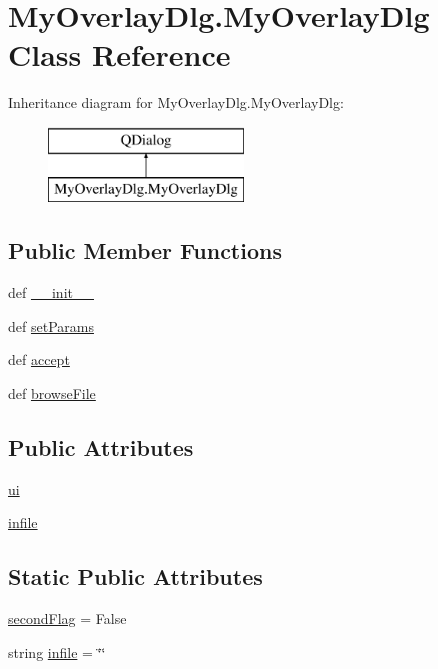 \hypertarget{class_my_overlay_dlg_1_1_my_overlay_dlg}{\section{My\-Overlay\-Dlg.\-My\-Overlay\-Dlg Class Reference}
\label{class_my_overlay_dlg_1_1_my_overlay_dlg}
}
Inheritance diagram for My\-Overlay\-Dlg.\-My\-Overlay\-Dlg\-:\begin{figure}[H]
\begin{center}
\leavevmode
\includegraphics[height=2.000000cm]{class_my_overlay_dlg_1_1_my_overlay_dlg}
\end{center}
\end{figure}
\subsection*{Public Member Functions}
\begin{DoxyCompactItemize}
\item 
def \hyperlink{class_my_overlay_dlg_1_1_my_overlay_dlg_a836f26cd68556b2b577ba8ebbc36892a}{\-\_\-\-\_\-init\-\_\-\-\_\-}
\item 
def \hyperlink{class_my_overlay_dlg_1_1_my_overlay_dlg_a30489fcaa881f5dccddcc4782a1fcb2e}{set\-Params}
\item 
def \hyperlink{class_my_overlay_dlg_1_1_my_overlay_dlg_a911fbf22d0431f251fedbc1cc9ceee34}{accept}
\item 
def \hyperlink{class_my_overlay_dlg_1_1_my_overlay_dlg_a6b58d65c0fb4398f5187d9636723d4fd}{browse\-File}
\end{DoxyCompactItemize}
\subsection*{Public Attributes}
\begin{DoxyCompactItemize}
\item 
\hyperlink{class_my_overlay_dlg_1_1_my_overlay_dlg_a7d657b769e24e56ee48781d352de441e}{ui}
\item 
\hyperlink{class_my_overlay_dlg_1_1_my_overlay_dlg_acca8e0275695cf61524525634591381b}{infile}
\end{DoxyCompactItemize}
\subsection*{Static Public Attributes}
\begin{DoxyCompactItemize}
\item 
\hyperlink{class_my_overlay_dlg_1_1_my_overlay_dlg_a90f6e4408789fb09a8373122658e9dda}{second\-Flag} = False
\item 
string \hyperlink{class_my_overlay_dlg_1_1_my_overlay_dlg_a9a655828844f2260620132477ff6e2ac}{infile} = \char`\"{}\char`\"{}
\end{DoxyCompactItemize}


